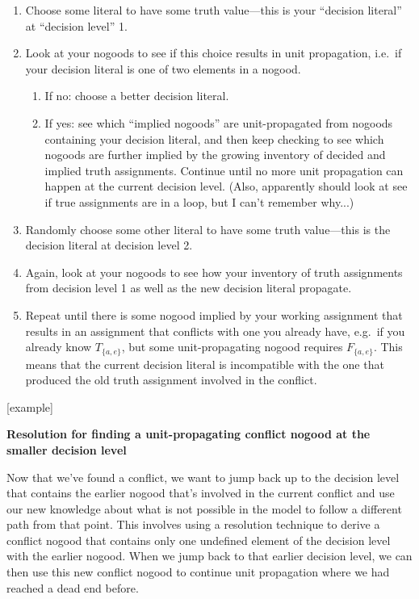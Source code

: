 \documentclass[9pt,a4paper,landscape]{article}
\newcommand{\ngtb}[1]{T_{ \{#1\} }}
\newcommand{\ngfb}[1]{F_{ \{#1\} }}
\begin{document}
{\begin{enumerate}
	\item Choose some literal to have some truth value---this is your ``decision literal'' at ``decision level'' 1.
	\item Look at your nogoods to see if this choice results in unit propagation, i.e.\ if your decision literal is one of two elements in a nogood.
	\begin{enumerate}
		\item If no: choose a better decision literal.
		\item If yes: see which ``implied nogoods'' are unit-propagated from nogoods containing your decision literal, and then keep checking to see which nogoods are further implied by the growing inventory of decided and implied truth assignments. 
		Continue until no more unit propagation can happen at the current decision level.
		(Also, apparently should look at see if true assignments are in a loop, but I can't remember why...)
	\end{enumerate}
	\item Randomly choose some other literal to have some truth value---this is the decision literal at decision level 2.
	\item Again, look at your nogoods to see how your inventory of truth assignments from decision level 1 as well as the new decision literal propagate.
	\item Repeat until there is some nogood implied by your working assignment that results in an assignment that conflicts with one you already have, e.g.\ if you already know $\ngtb{a, e}$, but some unit-propagating nogood requires $\ngfb{a, e}$.
	This means that the current decision literal is incompatible with the one that produced the old truth assignment involved in the conflict.
\end{enumerate}

[example]

\vspace{\baselineskip}
\textbf{Resolution for finding a unit-propagating conflict nogood at the smaller decision level}

Now that we've found a conflict, we want to jump back up to the decision level that contains the earlier nogood that's involved in the current conflict and use our new knowledge about what is not possible in the model to follow a different path from that point.
This involves using a resolution technique to derive a conflict nogood that contains only one undefined element of the decision level with the earlier nogood.
When we jump back to that earlier decision level, we can then use this new conflict nogood to continue unit propagation where we had reached a dead end before.

}
\end{document}
